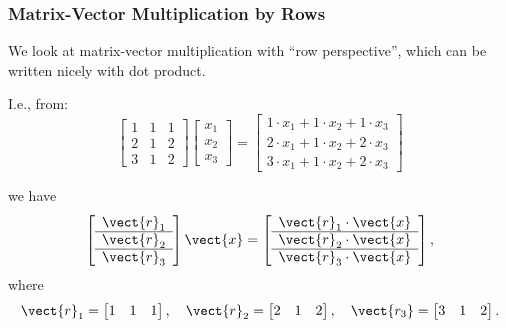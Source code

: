 \begin{frame}
  \frametitle{Matrix-Vector Multiplication {\bf by Rows}}

  We look at matrix-vector multiplication with ``row perspective'',
  which can be written nicely with dot product.

  I.e., from:
  \[
  \begin{bmatrix}
    1 & 1 & 1 \\
    2 & 1 & 2 \\
    3 & 1 & 2
  \end{bmatrix}
  \begin{bmatrix}
    x_1\\
    x_2\\
    x_3
  \end{bmatrix}
  =
  \begin{bmatrix}
    1\cdot x_1 + 1\cdot x_2 + 1\cdot x_3 \\
    2\cdot x_1 + 1\cdot x_2 + 2\cdot x_3 \\
    3\cdot x_1 + 1\cdot x_2 + 2\cdot x_3
  \end{bmatrix}
  \]

  we have
  \[
  \left[
    \begin{array}{c}
      \vect{r}_1 \\
      \hline
      \vect{r}_2 \\
      \hline
      \vect{r}_3 
    \end{array}
    \right]
  \vect{x}
  =
  \left[
    \begin{array}{c}
      \vect{r}_1\cdot\vect{x} \\
      \hline
      \vect{r}_2\cdot\vect{x} \\
      \hline
      \vect{r}_3\cdot\vect{x}
    \end{array}
    \right],
  \]
  where
  \[
  \vect{r}_1=
  \begin{bmatrix}
    1 & 1 & 1
  \end{bmatrix},
  \ \ \
  \vect{r}_2=
  \begin{bmatrix}
    2 & 1 & 2
  \end{bmatrix},
  \ \ \
  \vect{r_3}=
  \begin{bmatrix}
    3 & 1 & 2
  \end{bmatrix}.
  \]
\end{frame}
  
